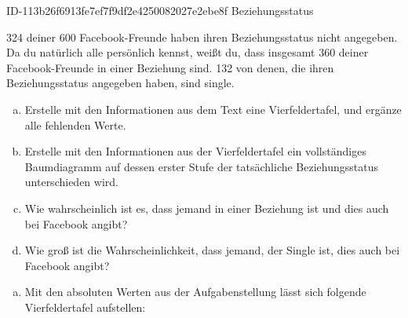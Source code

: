 \begin{exercise}
      {ID-113b26f6913fe7ef7f9df2e4250082027e2ebe8f}
      {Beziehungsstatus}
  \ifproblem\problem\par
    \num{324} deiner \num{600} Facebook-Freunde haben
    ihren Beziehungsstatus nicht angegeben. Da du
    natürlich alle persönlich kennst, weißt du, dass
    insgesamt \num{360} deiner Face\-book-Freunde in
    einer Beziehung sind. \num{132} von denen, die
    ihren Beziehungsstatus angegeben haben, sind
    single.
    \begin{enumerate}[a)]
      \item Erstelle mit den Informationen aus dem
            Text eine Vierfeldertafel, und ergänze
            alle fehlenden Werte.
      \item Erstelle mit den Informationen aus der
            Vierfeldertafel ein vollständiges
            Baumdiagramm auf dessen erster Stufe
            der tatsächliche Beziehungsstatus
            unterschieden wird.
      \item Wie wahrscheinlich ist es, dass jemand
            in einer Beziehung ist und dies auch bei
            Facebook angibt?
      \item Wie groß ist die Wahrscheinlichkeit, dass
            jemand, der Single ist, dies auch bei
            Facebook angibt?
    \end{enumerate}
  \fi
  \ifoutcome\outcome
    \begin{enumerate}[a)]
      \item Mit den absoluten Werten aus der Aufgabenstellung
            lässt sich folgende Vierfeldertafel aufstellen:\par
            \begin{minipage}[c]{0.41\linewidth}
              \begin{fofotab}%
              \end{fofotab}

\end{minipage}
\end{enumerate}
\end{exercise}
